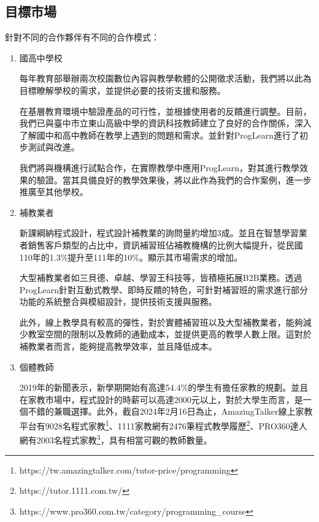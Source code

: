 

\newpage
\subsection{目標市場} %

針對不同的合作夥伴有不同的合作模式：

\begin{enumerate}
  \setlength{\parindent}{2em}
  
  \item 國高中學校
  \par 每年教育部舉辦兩次校園數位內容與教學軟體的公開徵求活動，我們將以此為目標瞭解學校的需求，並提供必要的技術支援和服務。
  \par 在基層教育環境中驗證產品的可行性，並根據使用者的反饋進行調整。目前，我們已與臺中市立東山高級中學的資訊科技教師建立了良好的合作關係，深入了解國中和高中教師在教學上遇到的問題和需求。並針對ProgLearn進行了初步測試與改進。
  \par 我們將與機構進行試點合作，在實際教學中應用ProgLearn，對其進行教學效果的驗證。當其具備良好的教學效果後，將以此作為我們的合作案例，進一步推廣至其他學校。
  \item 補教業者
  \par 新課綱納程式設計，程式設計補教業的詢問量約增加3成\cite{ref:補教業者}。並且在智慧學習業者銷售客戶類型的占比中，資訊補習班佔補教機構的比例大幅提升，從民國110年的1.3\%提升至111年的10\%\cite{ref:111產業產值調查報告}\cite{ref:110產業產值調查報告}。顯示其市場需求的增加。
  \par 大型補教業者如三貝德、卓越、學習王科技等，皆積極拓展B2B業務。透過ProgLearn針對互動式教學、即時反饋的特色，可針對補習班的需求進行部分功能的系統整合與模組設計，提供技術支援與服務。
  \par 此外，線上教學具有較高的彈性，對於實體補習班以及大型補教業者，能夠減少教室空間的限制以及教師的通勤成本，並提供更高的教學人數上限。這對於補教業者而言，能夠提高教學效率，並且降低成本。
  \item 個體教師
  \par 2019年的新聞表示，新學期開始有高達54.4\%的學生有擔任家教的規劃\cite{ref:家教}。並且在家教市場中，程式設計的時薪可以高達2000元以上\cite{ref:補教業者}，對於大學生而言，是一個不錯的兼職選擇。此外，截自2024年2月16日為止，AmazingTalker線上家教平台有9028名程式家教\footnote{https://tw.amazingtalker.com/tutor-price/programming}、1111家教網有2476筆程式教學履歷\footnote{https://tutor.1111.com.tw/}、PRO360達人網有2003名程式家教\footnote{https://www.pro360.com.tw/category/programming\_course}，具有相當可觀的教師數量。

\end{enumerate}
